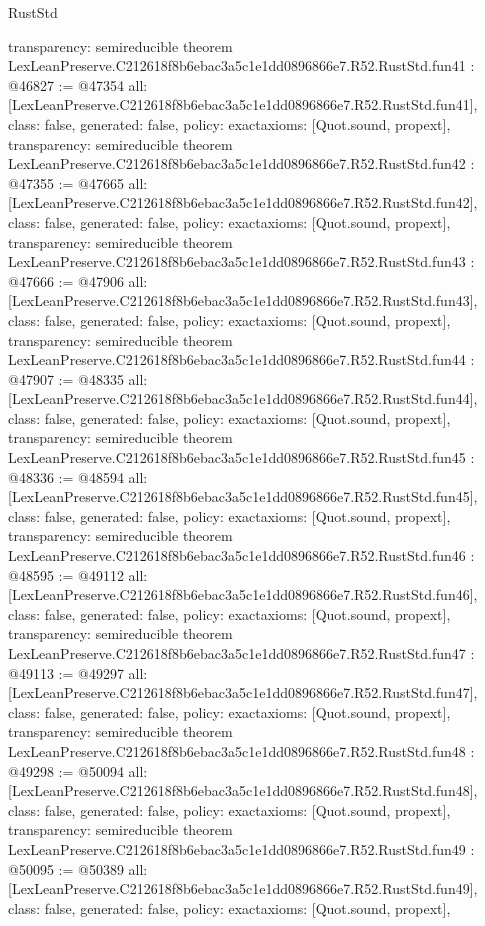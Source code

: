\begin{lexlean}{RustStd}
\begin{coremodule}
{  transparency: semireducible
}
theorem LexLeanPreserve.C212618f8b6ebac3a5c1e1dd0896866e7.R52.RustStd.fun41 : @46827 := @47354 {
  all: [LexLeanPreserve.C212618f8b6ebac3a5c1e1dd0896866e7.R52.RustStd.fun41],
  class: false,
  generated: false,
  policy: exact{axioms: [Quot.sound, propext]},
  transparency: semireducible
}
theorem LexLeanPreserve.C212618f8b6ebac3a5c1e1dd0896866e7.R52.RustStd.fun42 : @47355 := @47665 {
  all: [LexLeanPreserve.C212618f8b6ebac3a5c1e1dd0896866e7.R52.RustStd.fun42],
  class: false,
  generated: false,
  policy: exact{axioms: [Quot.sound, propext]},
  transparency: semireducible
}
theorem LexLeanPreserve.C212618f8b6ebac3a5c1e1dd0896866e7.R52.RustStd.fun43 : @47666 := @47906 {
  all: [LexLeanPreserve.C212618f8b6ebac3a5c1e1dd0896866e7.R52.RustStd.fun43],
  class: false,
  generated: false,
  policy: exact{axioms: [Quot.sound, propext]},
  transparency: semireducible
}
theorem LexLeanPreserve.C212618f8b6ebac3a5c1e1dd0896866e7.R52.RustStd.fun44 : @47907 := @48335 {
  all: [LexLeanPreserve.C212618f8b6ebac3a5c1e1dd0896866e7.R52.RustStd.fun44],
  class: false,
  generated: false,
  policy: exact{axioms: [Quot.sound, propext]},
  transparency: semireducible
}
theorem LexLeanPreserve.C212618f8b6ebac3a5c1e1dd0896866e7.R52.RustStd.fun45 : @48336 := @48594 {
  all: [LexLeanPreserve.C212618f8b6ebac3a5c1e1dd0896866e7.R52.RustStd.fun45],
  class: false,
  generated: false,
  policy: exact{axioms: [Quot.sound, propext]},
  transparency: semireducible
}
theorem LexLeanPreserve.C212618f8b6ebac3a5c1e1dd0896866e7.R52.RustStd.fun46 : @48595 := @49112 {
  all: [LexLeanPreserve.C212618f8b6ebac3a5c1e1dd0896866e7.R52.RustStd.fun46],
  class: false,
  generated: false,
  policy: exact{axioms: [Quot.sound, propext]},
  transparency: semireducible
}
theorem LexLeanPreserve.C212618f8b6ebac3a5c1e1dd0896866e7.R52.RustStd.fun47 : @49113 := @49297 {
  all: [LexLeanPreserve.C212618f8b6ebac3a5c1e1dd0896866e7.R52.RustStd.fun47],
  class: false,
  generated: false,
  policy: exact{axioms: [Quot.sound, propext]},
  transparency: semireducible
}
theorem LexLeanPreserve.C212618f8b6ebac3a5c1e1dd0896866e7.R52.RustStd.fun48 : @49298 := @50094 {
  all: [LexLeanPreserve.C212618f8b6ebac3a5c1e1dd0896866e7.R52.RustStd.fun48],
  class: false,
  generated: false,
  policy: exact{axioms: [Quot.sound, propext]},
  transparency: semireducible
}
theorem LexLeanPreserve.C212618f8b6ebac3a5c1e1dd0896866e7.R52.RustStd.fun49 : @50095 := @50389 {
  all: [LexLeanPreserve.C212618f8b6ebac3a5c1e1dd0896866e7.R52.RustStd.fun49],
  class: false,
  generated: false,
  policy: exact{axioms: [Quot.sound, propext]},
}
\end{coremodule}
\end{lexlean}
